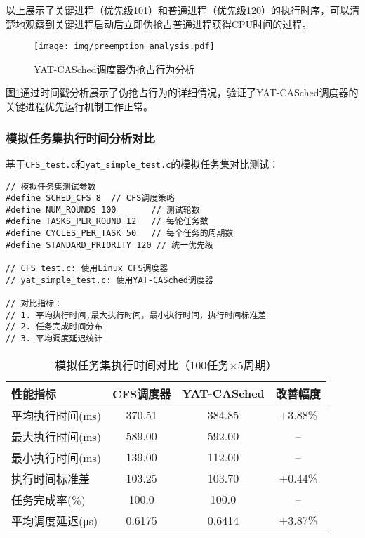 以上展示了关键进程（优先级101）和普通进程（优先级120）的执行时序，可以清楚地观察到关键进程启动后立即伪抢占普通进程获得CPU时间的过程。

\begin{figure}[H]
\centering
\texttt{[image: img/preemption\_analysis.pdf]}
\caption{YAT-CASched调度器伪抢占行为分析}
\label{fig:preemption-analysis}
\end{figure}

图\ref{fig:preemption-analysis}通过时间戳分析展示了伪抢占行为的详细情况，验证了YAT-CASched调度器的关键进程优先运行机制工作正常。

\subsubsection{模拟任务集执行时间分析对比}

基于\texttt{CFS\_test.c}和\texttt{yat\_simple\_test.c}的模拟任务集对比测试：

\begin{tcolorbox} [
    enhanced,
    colback=blue!5,
    colframe=blue!40!black,
    leftrule=3mm,
    rightrule=0mm,
    toprule=0mm,
    bottomrule=0mm,
    arc=2mm,
    left=5mm,
    right=5mm,
    top=3mm,
    bottom=3mm,
    fonttitle=\bfseries,
    title=\textbf{模拟任务集测试配置}
]
\begin{lstlisting}[basicstyle=\footnotesize\fontfamily{zi4}\selectfont, showstringspaces=false]
// 模拟任务集测试参数
#define SCHED_CFS 8  // CFS调度策略
#define NUM_ROUNDS 100       // 测试轮数
#define TASKS_PER_ROUND 12   // 每轮任务数
#define CYCLES_PER_TASK 50   // 每个任务的周期数
#define STANDARD_PRIORITY 120 // 统一优先级

// CFS_test.c: 使用Linux CFS调度器
// yat_simple_test.c: 使用YAT-CASched调度器

// 对比指标：
// 1. 平均执行时间,最大执行时间，最小执行时间，执行时间标准差
// 2. 任务完成时间分布
// 3. 平均调度延迟统计
\end{lstlisting}
\end{tcolorbox}

\begin{table}[H]
\centering
\caption{模拟任务集执行时间对比（100任务×5周期）}
\label{tab:synthetic-workload-comparison}
\begin{tabular}{|l|c|c|c|}
\hline
\textbf{性能指标} & \textbf{CFS调度器} & \textbf{YAT-CASched} & \textbf{改善幅度} \\
\hline
平均执行时间(ms) & 370.51 & 384.85 & +3.88\% \\
\hline
最大执行时间(ms) & 589.00 & 592.00 & -- \\
\hline
最小执行时间(ms) & 139.00  & 112.00 & -- \\
\hline
执行时间标准差 & 103.25 & 103.70 & +0.44\% \\
\hline
任务完成率(\%) & 100.0 & 100.0 & -- \\
\hline
平均调度延迟(μs) & 0.6175 & 0.6414 & +3.87\% \\
\hline
\end{tabular}
\end{table}

